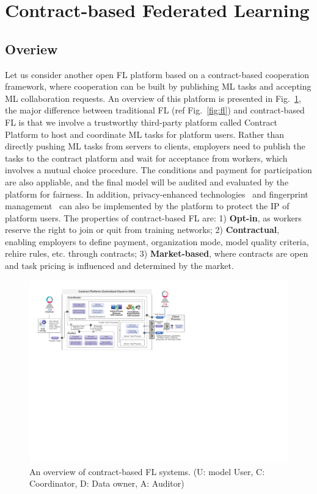 \section{Contract-based Federated Learning}
\label{sec:contract}
\subsection{Overiew}
\label{sec:contract_overview}
Let us consider another open FL platform based on a contract-based cooperation framework, where cooperation can be built by publishing ML tasks and accepting ML collaboration requests.
An overview of this platform is presented in Fig.~\ref{fig:contract}, the major difference between traditional FL (ref Fig.~\ref{fig:fl}) and contract-based FL is that we involve a trustworthy third-party platform called Contract Platform to host and coordinate ML tasks for platform users.
Rather than directly pushing ML tasks from servers to clients, employers need to publish the tasks to the contract platform and wait for acceptance from workers, which involves a mutual choice procedure. 
The conditions and payment for participation are also appliable, and the final model will be audited and evaluated by the platform for fairness.
In addition, privacy-enhanced technologies~\cite{hesamifard2018privacy} and fingerprint management~\cite{chen2022copy} can also be implemented by the platform to protect the IP of platform users.
The properties of contract-based FL are: 1) \textbf{Opt-in}, as workers reserve the right to join or quit from training networks; 2) \textbf{Contractual}, enabling employers to define payment, organization mode, model quality criteria, rehire rules, etc. through contracts; 3) \textbf{Market-based}, where contracts are open and task pricing is influenced and determined by the market.

\begin{figure}[t]
    \centering
    \includegraphics[width=\linewidth]{fig/contract_frame.pdf}
    \caption{An overview of contract-based FL systems. (U: model User, C: Coordinator, D: Data owner, A: Auditor)}
    \label{fig:contract}
\end{figure}

